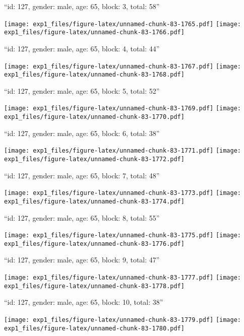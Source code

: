 \documentclass[11pt,,]{article}
\begin{document}
\newpage
[1] 

``id: 127, gender: male, age: 65, block: 3, total: 58''

\texttt{[image: exp1\_files/figure-latex/unnamed-chunk-83-1765.pdf]}
\texttt{[image: exp1\_files/figure-latex/unnamed-chunk-83-1766.pdf]}

\newpage
[1] 

``id: 127, gender: male, age: 65, block: 4, total: 44''

\texttt{[image: exp1\_files/figure-latex/unnamed-chunk-83-1767.pdf]}
\texttt{[image: exp1\_files/figure-latex/unnamed-chunk-83-1768.pdf]}

\newpage
[1] 

``id: 127, gender: male, age: 65, block: 5, total: 52''

\texttt{[image: exp1\_files/figure-latex/unnamed-chunk-83-1769.pdf]}
\texttt{[image: exp1\_files/figure-latex/unnamed-chunk-83-1770.pdf]}

\newpage
[1] 

``id: 127, gender: male, age: 65, block: 6, total: 38''

\texttt{[image: exp1\_files/figure-latex/unnamed-chunk-83-1771.pdf]}
\texttt{[image: exp1\_files/figure-latex/unnamed-chunk-83-1772.pdf]}

\newpage
[1] 

``id: 127, gender: male, age: 65, block: 7, total: 48''

\texttt{[image: exp1\_files/figure-latex/unnamed-chunk-83-1773.pdf]}
\texttt{[image: exp1\_files/figure-latex/unnamed-chunk-83-1774.pdf]}

\newpage
[1] 

``id: 127, gender: male, age: 65, block: 8, total: 55''

\texttt{[image: exp1\_files/figure-latex/unnamed-chunk-83-1775.pdf]}
\texttt{[image: exp1\_files/figure-latex/unnamed-chunk-83-1776.pdf]}

\newpage
[1] 

``id: 127, gender: male, age: 65, block: 9, total: 47''

\texttt{[image: exp1\_files/figure-latex/unnamed-chunk-83-1777.pdf]}
\texttt{[image: exp1\_files/figure-latex/unnamed-chunk-83-1778.pdf]}

\newpage
[1] 

``id: 127, gender: male, age: 65, block: 10, total: 38''

\texttt{[image: exp1\_files/figure-latex/unnamed-chunk-83-1779.pdf]}
\texttt{[image: exp1\_files/figure-latex/unnamed-chunk-83-1780.pdf]}
\end{document}
